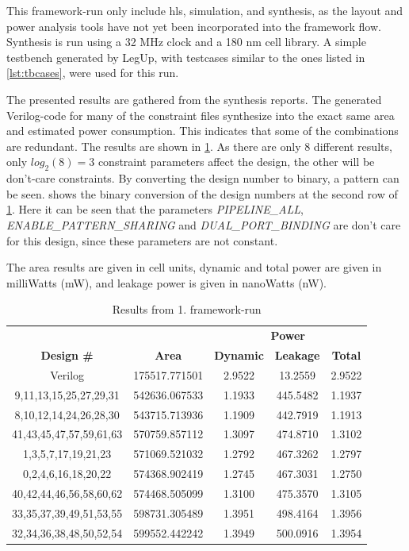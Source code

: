 This framework-run only include \gls{hls}, simulation, and synthesis, as the layout and power analysis tools have not yet been incorporated into the framework flow. Synthesis is run using a 32 MHz clock and a 180 nm cell library. A simple testbench generated by LegUp, with testcases similar to the ones listed in \cref{lst:tbcases}, were used for this run. 

The presented results are gathered from the synthesis reports. The generated Verilog-code for many of the constraint files synthesize into the exact same area and estimated power consumption. This indicates that some of the combinations are redundant. The results are shown in \cref{tab:hlsrun1dataresults}. As there are only 8 different results, only $log_2(8) = 3$ constraint parameters affect the design, the other will be don't-care constraints. By converting the design number to binary, a pattern can be seen.  shows the binary conversion of the design numbers at the second row of \cref{tab:hlsrun1dataresults}. Here it can be seen that the parameters \textit{PIPELINE\_ALL}, \textit{ENABLE\_PATTERN\_SHARING} and \textit{DUAL\_PORT\_BINDING} are don't care for this design, since these parameters are not constant.

The area results are given in cell units, dynamic and total power are given in milliWatts (mW), and leakage power is given in nanoWatts (nW).


\begin{table}[hbtp]
    \centering
    \begin{tabular}{ccccc}
    & & \multicolumn{3}{c}{\textbf{Power}} \\
    \cline{3-5}
    \textbf{Design \#} & \textbf{Area} & \textbf{Dynamic} & \textbf{Leakage} & \textbf{Total} \\
    \toprule
    Verilog & 175517.771501 & 2.9522 & 13.2559 & 2.9522 \\
    9,11,13,15,25,27,29,31 & 542636.067533 & 1.1933 & 445.5482 & 1.1937 \\
    8,10,12,14,24,26,28,30 & 543715.713936 & 1.1909 & 442.7919 & 1.1913 \\
    41,43,45,47,57,59,61,63 & 570759.857112 & 1.3097 & 474.8710 & 1.3102 \\
    1,3,5,7,17,19,21,23 & 571069.521032 & 1.2792 & 467.3262 & 1.2797 \\
    0,2,4,6,16,18,20,22 & 574368.902419 & 1.2745 & 467.3031 & 1.2750 \\
    40,42,44,46,56,58,60,62 & 574468.505099 & 1.3100 & 475.3570 & 1.3105 \\
    33,35,37,39,49,51,53,55 & 598731.305489 & 1.3951 & 498.4164 & 1.3956 \\
    32,34,36,38,48,50,52,54 & 599552.442242 & 1.3949 & 500.0916 & 1.3954 \\
    \bottomrule
    \end{tabular}
    \caption{Results from 1. framework-run}
    \label{tab:hlsrun1dataresults}
\end{table}


